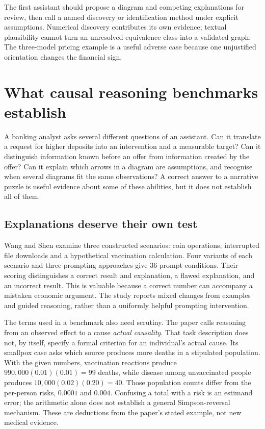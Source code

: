 The first assistant should propose a diagram and competing explanations
for review, then call a named discovery or identification method under
explicit assumptions. Numerical discovery contributes its own evidence;
textual plausibility cannot turn an unresolved equivalence class into
a validated graph. The three-model pricing example is a useful adverse
case because one unjustified orientation changes the financial sign.



\section{What causal reasoning benchmarks establish}
\label{gap29:frontier}
A banking analyst asks several different questions of an assistant. Can it
translate a request for higher deposits into an intervention and a measurable
target? Can it distinguish information known before an offer from information
created by the offer? Can it explain which arrows in a diagram are assumptions,
and recognise when several diagrams fit the same observations? A correct
answer to a narrative puzzle is useful evidence about some of these abilities,
but it does not establish all of them.

\subsection{Explanations deserve their own test}
Wang and Shen examine three constructed scenarios: coin operations, interrupted
file downloads and a hypothetical vaccination calculation. Four variants of
each scenario and three prompting approaches give 36 prompt conditions.
Their scoring distinguishes a correct result and explanation, a flawed
explanation, and an incorrect result. This is valuable because a correct
number can accompany a mistaken economic argument. The study reports mixed
changes from examples and guided reasoning, rather than a uniformly helpful
prompting intervention. \citep{gap29wangshen}

The terms used in a benchmark also need scrutiny. The paper calls reasoning
from an observed effect to a cause \emph{actual causality}. That task description
does not, by itself, specify a formal criterion for an individual's actual
cause. Its smallpox case asks which source produces more deaths in a stipulated
population. With the given numbers, vaccination reactions produce
$990{,}000(0.01)(0.01)=99$ deaths, while disease among unvaccinated people
produces $10{,}000(0.02)(0.20)=40$. Those population counts differ from the
per-person risks, $0.0001$ and $0.004$. Confusing a total with a risk is an
estimand error; the arithmetic alone does not establish a general
Simpson-reversal mechanism. These are deductions from the paper's stated
example, not new medical evidence.

